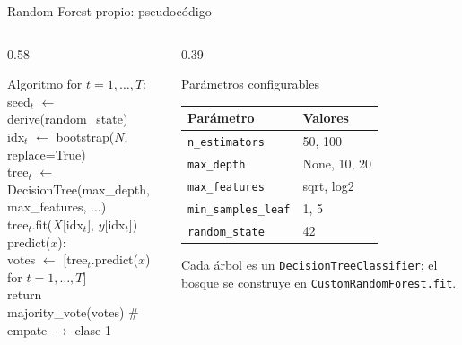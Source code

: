 \documentclass[aspectratio=169,11pt]{beamer}
\begin{document}
\begin{frame}{Random Forest propio: pseudocódigo}
  \begin{columns}[T]
    \begin{column}{0.58\textwidth}
      \begin{block}{Algoritmo}
        \ttfamily\scriptsize
        for $t = 1,\dots,T$:\\
        \hspace*{0.4cm}seed$_t$ $\leftarrow$ derive(random\_state)\\
        \hspace*{0.4cm}idx$_t$ $\leftarrow$ bootstrap($N$, replace=True)\\
        \hspace*{0.4cm}tree$_t$ $\leftarrow$ DecisionTree(max\_depth, max\_features, ...)\\
        \hspace*{0.4cm}tree$_t$.fit($X$[idx$_t$], $y$[idx$_t$])\\[2pt]
        predict($x$):\\
        \hspace*{0.4cm}votes $\leftarrow$ [tree$_t$.predict($x$) for $t=1,\dots,T$]\\
        \hspace*{0.4cm}return majority\_vote(votes) \# empate $\to$ clase 1
      \end{block}
    \end{column}
    \begin{column}{0.39\textwidth}
      \begin{block}{Parámetros configurables}
        \scriptsize
        \begin{tabular}{@{}ll@{}}
          \toprule
          Parámetro & Valores \\
          \midrule
          \texttt{n\_estimators} & 50, 100 \\
          \texttt{max\_depth} & None, 10, 20 \\
          \texttt{max\_features} & sqrt, log2 \\
          \texttt{min\_samples\_leaf} & 1, 5 \\
          \texttt{random\_state} & 42 \\
          \bottomrule
        \end{tabular}
      \end{block}
      \vspace{0.1cm}
      {\scriptsize Cada árbol es un \texttt{DecisionTreeClassifier};
      el bosque se construye en \texttt{CustomRandomForest.fit}.}
    \end{column}
  \end{columns}
\end{frame}
\end{document}

